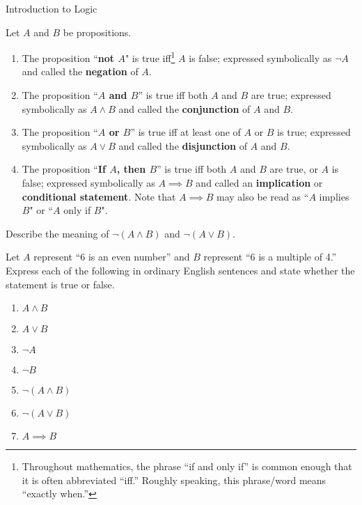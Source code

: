 \begin{section}{Introduction to Logic}
\begin{definition}
Let $A$ and $B$ be propositions.  
\begin{enumerate}[label=\textrm{(\alph*)}]
\item The proposition ``\textbf{not $A$}" is true iff\footnote{Throughout mathematics, the phrase ``if and only if'' is common enough that it is often abbreviated ``iff.'' Roughly speaking, this phrase/word means ``exactly when.''} $A$ is false; expressed symbolically as $\boxed{\neg A}$ and called the \textbf{negation} of $A$.
\item The proposition ``\textbf{$A$ and $B$}'' is true iff both $A$ and $B$ are true; expressed symbolically as $\boxed{A \wedge B}$ and called the \textbf{conjunction} of $A$ and $B$.
\item The proposition ``\textbf{$A$ or $B$}'' is true iff at least one of $A$ or $B$ is true; expressed symbolically as $\boxed{A \vee B}$ and called the \textbf{disjunction} of $A$ and $B$.
\item The proposition ``\textbf{If $A$, then $B$}'' is true iff both $A$ and $B$ are true, or $A$ is false; expressed symbolically as $\boxed{A \implies B}$ and called an \textbf{implication} or \textbf{conditional statement}. Note that $A \implies B$ may also be read as ``$A$ implies $B$" or ``$A$ only if $B$". 
\end{enumerate}
\end{definition}

\begin{exercise}
Describe the meaning of $\neg (A \wedge B)$ and $\neg (A \vee B)$.
\end{exercise}

\begin{exercise}\label{exer:translations}
Let $A$ represent ``6 is an even number'' and $B$ represent ``6 is a multiple of 4.''  Express each of the following in ordinary English sentences and state whether the statement is true or false.
\begin{enumerate}[label=\textrm{(\alph*)}]
  \item $A \wedge B$
  \item $A \vee B$
  \item $\neg A$
  \item $\neg B$
  \item $\neg (A \wedge B)$
  \item $\neg (A \vee B)$
  \item $A \implies B$
\end{enumerate}
\end{exercise}


\end{section}
